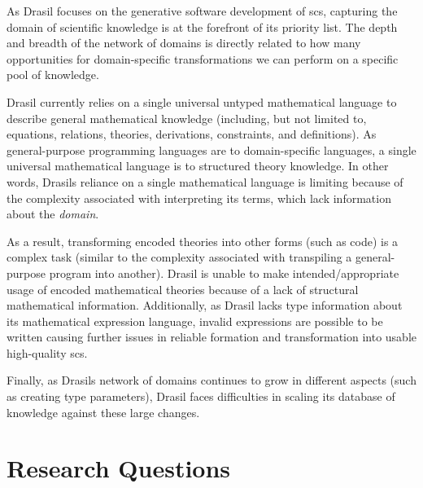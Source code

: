 As Drasil focuses on the generative software development of \acs{scs}, capturing
the domain of scientific knowledge is at the forefront of its priority list. The
depth and breadth of the network of domains is directly related to how many
opportunities for domain-specific transformations we can perform on a specific
pool of knowledge.

Drasil currently relies on a single universal untyped mathematical language to
describe general mathematical knowledge (including, but not limited to,
equations, relations, theories, derivations, constraints, and definitions). As
general-purpose programming languages are to domain-specific languages, a single
universal mathematical language is to structured theory knowledge. In other
words, Drasils reliance on a single mathematical language is limiting because of
the complexity associated with interpreting its terms, which lack information
about the \textit{domain}.

As a result, transforming encoded theories into other forms (such as code) is a
complex task (similar to the complexity associated with transpiling a
general-purpose program into another). Drasil is
unable to make intended/appropriate usage of encoded mathematical theories
because of a lack of structural mathematical information. Additionally, as
Drasil lacks type information about its mathematical expression language,
invalid expressions are possible to be written causing further issues in
reliable formation and transformation into usable high-quality \acs{scs}.

Finally, as Drasils network of domains continues to grow in different aspects
(such as creating type parameters), Drasil faces difficulties in scaling its
database of knowledge against these large changes.

\section{Research Questions}
\label{sec:intro:researchquestions}

